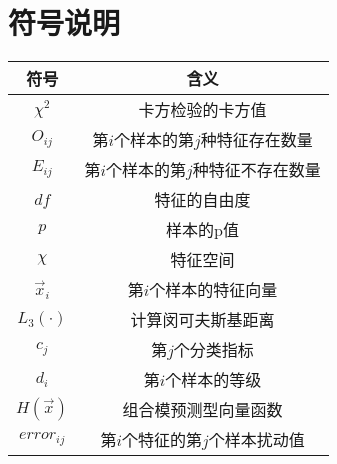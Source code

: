 \section{符号说明}



\begin{table}[H]
	\centering  %
	\begin{tabular}{c c}  %
		\toprule[1.5pt]  %
		符号 & 含义  \\   %
		\midrule[1pt]    %
        ${{\chi }^{2}}$	            &  卡方检验的卡方值  \\
        ${{O}_{ij}}$                &  第$i$个样本的第$j$种特征存在数量  \\
        ${{E}_{ij}}$                &  第$i$个样本的第$j$种特征不存在数量  \\
        $df$	                    &  特征的自由度  \\
        $p$	                        &  样本的p值  \\
        $\chi$                      &  特征空间  \\
        ${{\overrightarrow{x}}_{i}}$ &	第$i$个样本的特征向量  \\
        ${{L}_{3}}\left( \cdot  \right)$ & 计算闵可夫斯基距离  \\
        ${{c}_{j}}$	 &  第$j$个分类指标  \\
        ${{d}_{i}}$	 &  第$i$个样本的等级  \\
        $H(\overrightarrow{x})$  &  组合模预测型向量函数  \\
        $erro{{r}_{ij}}$	     &  第$i$个特征的第$j$个样本扰动值  \\
		\toprule[1.5pt]  %
	\end{tabular}  
\end{table} 







